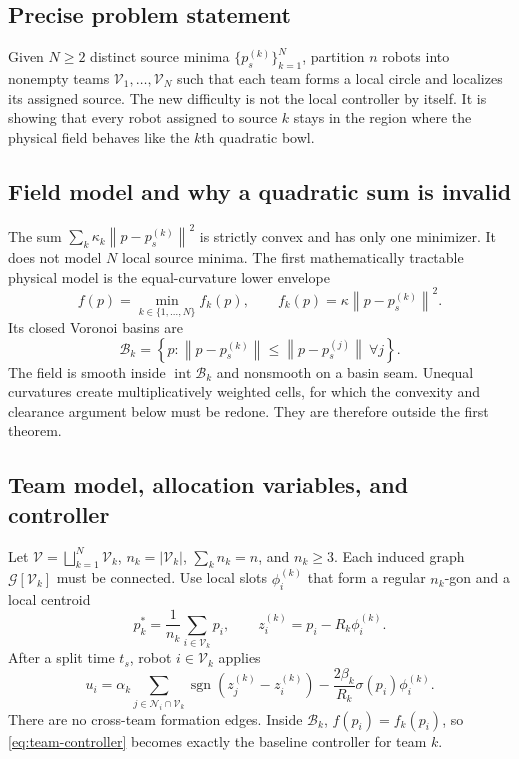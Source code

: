 \documentclass[11pt]{article}
\newcommand{\V}{\mathcal{V}}
\newcommand{\N}{\mathcal{N}}
\newcommand{\sgn}{\operatorname{sgn}}
\newcommand{\norm}[1]{\left\lVert #1\right\rVert}
\begin{document}
\subsection{Precise problem statement}

Given $N\geq2$ distinct source minima $\{p_s^{(k)}\}_{k=1}^N$, partition $n$ robots into nonempty teams $\V_1,\ldots,\V_N$ such that each team forms a local circle and localizes its assigned source. The new difficulty is not the local controller by itself. It is showing that every robot assigned to source $k$ stays in the region where the physical field behaves like the $k$th quadratic bowl.

\subsection{Field model and why a quadratic sum is invalid}

The sum $\sum_k\kappa_k\norm{p-p_s^{(k)}}^2$ is strictly convex and has only one minimizer. It does not model $N$ local source minima. The first mathematically tractable physical model is the equal-curvature lower envelope
\begin{equation}\label{eq:multisource-field}
    f(p)=\min_{k\in\{1,\ldots,N\}}f_k(p),
    \qquad f_k(p)=\kappa\norm{p-p_s^{(k)}}^2.
\end{equation}
Its closed Voronoi basins are
\begin{equation}\label{eq:voronoi-basins}
    \mathcal{B}_k=\left\{p:\norm{p-p_s^{(k)}}\leq\norm{p-p_s^{(j)}}\ \forall j\right\}.
\end{equation}
The field is smooth inside $\operatorname{int}\mathcal{B}_k$ and nonsmooth on a basin seam. Unequal curvatures create multiplicatively weighted cells, for which the convexity and clearance argument below must be redone. They are therefore outside the first theorem.

\subsection{Team model, allocation variables, and controller}

Let $\V=\bigsqcup_{k=1}^N\V_k$, $n_k=|\V_k|$, $\sum_kn_k=n$, and $n_k\geq3$. Each induced graph $\mathcal{G}[\V_k]$ must be connected. Use local slots $\phi_{i}^{(k)}$ that form a regular $n_k$-gon and a local centroid
\begin{equation}\label{eq:team-centroid}
    p_k^*=\frac1{n_k}\sum_{i\in\V_k}p_i,\qquad
    z_i^{(k)}=p_i-R_k\phi_i^{(k)}.
\end{equation}
After a split time $t_s$, robot $i\in\V_k$ applies
\begin{equation}\label{eq:team-controller}
    u_i=\alpha_k\sum_{j\in\N_i\cap\V_k}\sgn\left(z_j^{(k)}-z_i^{(k)}\right)
        -\frac{2\beta_k}{R_k}\sigma(p_i)\phi_i^{(k)}.
\end{equation}
There are no cross-team formation edges. Inside $\mathcal{B}_k$, $f(p_i)=f_k(p_i)$, so \eqref{eq:team-controller} becomes exactly the baseline controller for team $k$.
\end{document}

